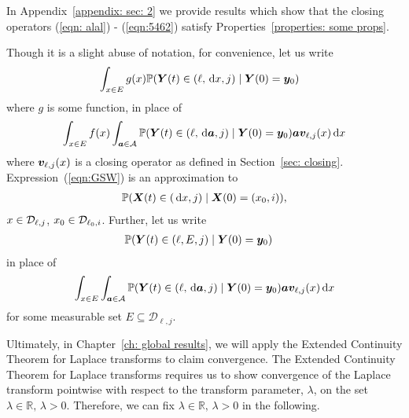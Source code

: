 In Appendix~\ref{appendix: sec: 2} we provide results which show that the closing operators (\ref{eqn: alal}) - (\ref{eqn:5462}) satisfy Properties~\ref{properties: some props}. 

Though it is a slight abuse of notation, for convenience, let us write 
\begin{align*}
	& \int_{x\in E}g(x)\mathbb P({\boldsymbol Y}(t) \in (\ell,\, \mathrm{d} x, j)\mid \boldsymbol Y(0)=\boldsymbol y_0 )
\end{align*}
where \(g\) is some function, in place of 
\begin{align}
	\int_{x\in E}f(x)\int_{\boldsymbol a \in\mathcal A}\mathbb P({\boldsymbol Y}(t) \in (\ell,\, \mathrm{d} \boldsymbol a, j)\mid \boldsymbol Y(0)=\boldsymbol y_0)\boldsymbol a\boldsymbol v_{\ell,j}(x)\, \mathrm{d} x \label{eqn:GSW}
\end{align}
where \(\boldsymbol v_{\ell,j}(x)\) is a closing operator as defined in Section~\ref{sec: closing}. Expression~(\ref{eqn:GSW}) is an approximation to 
\begin{align}
	\mathbb P(\boldsymbol X(t)\in(\, \mathrm{d} x, j)\mid \boldsymbol X(0)=(x_0, i)),
\end{align}
\(x\in \mathcal{D}_{\ell,j}\), \(x_0\in\mathcal{D}_{\ell_0,i}\).
Further, let us write 
\begin{align*}
	& \mathbb P({\boldsymbol Y} (t) \in (\ell,E, j)\mid \boldsymbol Y (0)=\boldsymbol y_0 )
\end{align*}
in place of 
\begin{align}
	\int_{x\in E}\int_{\boldsymbol a \in\mathcal A}\mathbb P({\boldsymbol Y} (t) \in (\ell,\, \mathrm{d} \boldsymbol a, j)\mid \boldsymbol Y (0)=\boldsymbol y_0  )\boldsymbol a\boldsymbol v_{\ell,j}(x)\, \mathrm{d} x \label{eqn:GSW2}
\end{align}
for some measurable set \(E\subseteq \mathcal D_{\ell,j}\). 

Ultimately, in Chapter~\ref{ch: global results}, we will apply the Extended Continuity Theorem for Laplace transforms \cite[Chapter XIII, Theorem 2a]{feller1957} to claim convergence. The Extended Continuity Theorem for Laplace transforms requires us to show convergence of the Laplace transform pointwise with respect to the transform parameter, \(\lambda\), on the set \(\lambda\in\mathbb R,\, \lambda>0\). Therefore, we can fix \(\lambda\in\mathbb R,\, \lambda>0\) in the following. 

